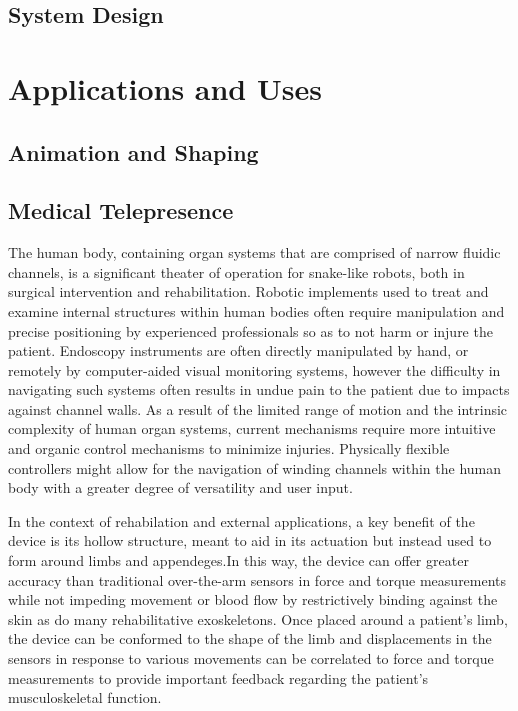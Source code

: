 \documentclass[11pt]{article}
\begin{document}
\subsection{System Design}
\section{Applications and Uses}
\subsection{Animation and Shaping}
\subsection{Medical Telepresence}

The human body, containing organ systems that are comprised of narrow fluidic channels, is a significant theater of operation for snake-like robots, both in surgical intervention and rehabilitation. Robotic implements used to treat and examine internal structures within human bodies often require manipulation and precise positioning by experienced professionals so as to not harm or injure the patient. Endoscopy instruments are often directly manipulated by hand, or remotely by computer-aided visual monitoring systems, however the difficulty in navigating such systems often results in undue pain to the patient due to impacts against channel walls. As a result of the limited range of motion and the intrinsic complexity of human organ systems, current mechanisms require more intuitive and organic control mechanisms to minimize injuries. Physically flexible controllers might allow for the navigation of winding channels within the human body with a greater degree of versatility and user input.

 In the context of rehabilation and external applications, a key benefit of the device is its hollow structure, meant to aid in its actuation but instead used to form around limbs and appendeges.In this way, the device can offer greater accuracy than traditional over-the-arm sensors in force and torque measurements while not impeding movement or blood flow by restrictively binding against the skin as do many rehabilitative exoskeletons. Once placed around a patient's limb, the device can be conformed to the shape of the limb and displacements in the sensors in response to various movements can be correlated to force and torque measurements to provide important feedback regarding the patient's musculoskeletal function.
\end{document}

